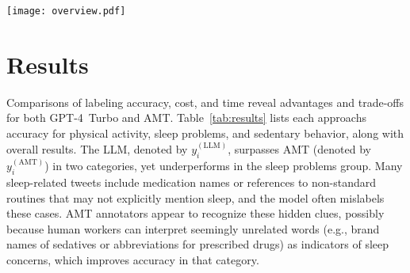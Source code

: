 \documentclass[letterpaper, 10 pt, conference]{ieeeconf} %
\begin{document}
\begin{figure*}
    \centering
    \texttt{[image: overview.pdf]}
    \vspace{-5mm}
    \caption{\footnotesize Overview of the LLM-based tweet annotation pipeline implemented in this paper. 
    The dataset \( X \) is partitioned into smaller chunks \( x_{i,k} \) to fit GPT-4\textquotesingle{}s context window. 
    Annotation guidelines are extracted from the instruction PDF and structured into a prompt \( P = g(D) \). 
    GPT-4 generates tweet labels \( y_i^{(\mathrm{LLM})} \), which undergo validation and correction in the output check stage. 
    The final structured labels are evaluated by comparing \( y^{(\mathrm{LLM})} \) with expert (\( y^{(\mathrm{EXP})} \)) and AMT-generated (\( y^{(\mathrm{AMT})} \)) labels using accuracy (\( \alpha \)), time (\( \tau \)), and cost (\( \kappa \)).}
    \label{fig:labeling-example}
     \vspace{-5mm}
\end{figure*}

\vspace{-1.5mm}
\section{Results}


Comparisons of labeling accuracy, cost, and time reveal advantages and trade-offs for both GPT-4~Turbo and AMT. Table~\ref{tab:results} lists each approach\textquotesingle{}s accuracy for physical activity, sleep problems, and sedentary behavior, along with overall results. The LLM, denoted by \(y_i^{(\mathrm{LLM})}\), surpasses AMT (denoted by \(y_i^{(\mathrm{AMT})}\)) in two categories, yet underperforms in the sleep problems group. Many sleep-related tweets include medication names or references to non-standard routines that may not explicitly mention sleep, and the model often mislabels these cases. AMT annotators appear to recognize these hidden clues, possibly because human workers can interpret seemingly unrelated words (e.g., brand names of sedatives or abbreviations for prescribed drugs) as indicators of sleep concerns, which improves accuracy in that category. 


\begin{table}[h]
    \centering
    \caption{\footnotesize AMT vs. GPT Accuracy in Tweet Labeling}
    \vspace{-2mm}
    \label{tab:results}
     \vspace{-3mm}
\end{table}
\end{document}
